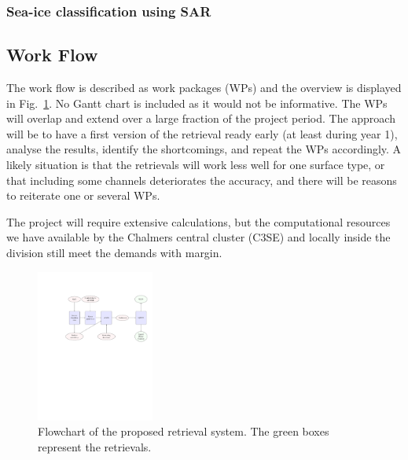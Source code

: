 \documentclass[12pt,oneside,a4paper]{article}
\begin{document}
\subsubsection{Sea-ice classification using SAR}



\subsection{Work Flow}
\label{sec:wp}


The work flow is described as work packages (WPs) and the overview is displayed
in Fig.~\ref{fig:flowchart}. No Gantt chart is included as it would not be
informative. The WPs will overlap and extend over a large fraction of the project
period. The approach will be to have a first version of the retrieval ready early (at least during year 1), analyse the results, identify the shortcomings, and repeat the WPs accordingly. A likely situation is that the retrievals will work less well for one surface type, or that including some channels deteriorates the accuracy, and there will be reasons to reiterate one or several WPs.

The project will require extensive calculations, but
the computational resources we have available by the Chalmers central cluster
(C3SE) and locally inside the division still meet the demands with margin.

\begin{figure}
	\begin{minipage}[c]{0.70\textwidth}
		\includegraphics[trim=140 420 25 125,clip,height = 50mm]{flowchart.pdf}
	\end{minipage}\hfill
	\begin{minipage}[c]{0.28\textwidth}
		\caption{Flowchart of the proposed retrieval system. The green boxes
          represent the retrievals. 
		} \label{fig:flowchart}
	\end{minipage}
\end{figure}

\vspace{-1ex}
\end{document}
